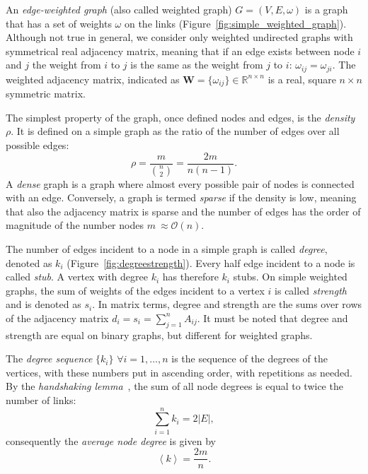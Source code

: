 An \emph{edge-weighted graph} (also called weighted graph) $G=(V,E,\omega)$ is a graph that has a set of weights $\omega$ on the links (Figure~\ref{fig:simple_weighted_graph}). Although not true in general, we consider only weighted undirected graphs with symmetrical real adjacency matrix, meaning that if an edge exists between node $i$ and $j$ the weight from $i$ to $j$ is the same as the weight from $j$ to $i$: $\omega_{ij}=\omega_{ji}$. The weighted adjacency matrix,  indicated as $\mathbf{W}=\{ \omega_{ij} \} \in \mathbb{R}^{n\times n}$ is a real, square $n \times n$ symmetric matrix.

The simplest property of the graph, once defined nodes and edges, is the \emph{density} $\rho$. It is defined on a simple graph as the ratio of the number of edges over all possible edges:
\begin{equation}
\rho = \frac{m}{\binom{n}{2}} = \frac{2m}{n(n-1)}.
\end{equation}
A \emph{dense} graph is a graph where almost every possible pair of nodes is connected with an edge. Conversely, a graph is termed \emph{sparse} if the density is low, meaning that also the adjacency matrix is sparse and the number of edges has the order of magnitude of the number nodes $m ~\approx \mathcal{O}(n)$.

The number of edges incident to a node in a simple graph is called \emph{degree}, denoted as $k_i$ (Figure~\ref{fig:degreestrength}). Every half edge incident to a node is called \emph{stub}. A vertex with degree $k_i$ has therefore $k_i$ stubs.
On simple weighted graphs, the sum of weights of the edges incident to a vertex $i$ is called \emph{strength} and is denoted as $s_i$. 
In matrix terms, degree and strength are the sums over rows of the adjacency matrix $d_i=s_i=\sum_{j=1}^n A_{ij}$. It must be noted that degree and strength are equal on binary graphs, but different for weighted graphs.

The \emph{degree sequence} $\{k_i\}$ $\forall i=1,\ldots,n$ is the sequence  of the degrees of the vertices, with these numbers put in ascending order, with
repetitions as needed. By the \emph{handshaking lemma}~\cite{leiserson2001}, the sum of all node degrees is equal to twice the number of links:
\begin{equation}
\label{eq:handshaking_lemma}
\sum_{i=1}^n k_i=2 |E|,
\end{equation}
consequently the \emph{average node degree} is given by
\begin{equation}
\left< k \right> = \frac{2m}{n}.
\end{equation}

